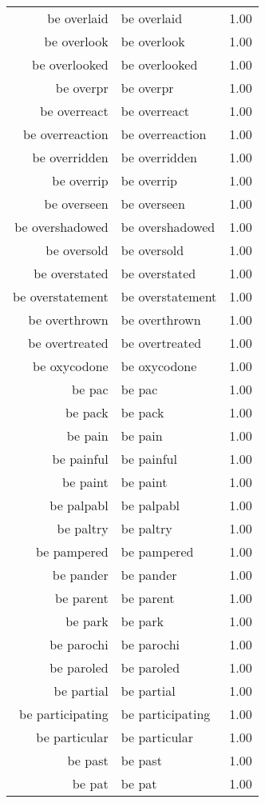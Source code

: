 \begin{table}[ht]
\begin{tabular}{rlr}
  be overlaid & be overlaid & 1.00 \\ 
  be overlook & be overlook & 1.00 \\ 
  be overlooked & be overlooked & 1.00 \\ 
  be overpr & be overpr & 1.00 \\ 
  be overreact & be overreact & 1.00 \\ 
  be overreaction & be overreaction & 1.00 \\ 
  be overridden & be overridden & 1.00 \\ 
  be overrip & be overrip & 1.00 \\ 
  be overseen & be overseen & 1.00 \\ 
  be overshadowed & be overshadowed & 1.00 \\ 
  be oversold & be oversold & 1.00 \\ 
  be overstated & be overstated & 1.00 \\ 
  be overstatement & be overstatement & 1.00 \\ 
  be overthrown & be overthrown & 1.00 \\ 
  be overtreated & be overtreated & 1.00 \\ 
  be oxycodone & be oxycodone & 1.00 \\ 
  be pac & be pac & 1.00 \\ 
  be pack & be pack & 1.00 \\ 
  be pain & be pain & 1.00 \\ 
  be painful & be painful & 1.00 \\ 
  be paint & be paint & 1.00 \\ 
  be palpabl & be palpabl & 1.00 \\ 
  be paltry & be paltry & 1.00 \\ 
  be pampered & be pampered & 1.00 \\ 
  be pander & be pander & 1.00 \\ 
  be parent & be parent & 1.00 \\ 
  be park & be park & 1.00 \\ 
  be parochi & be parochi & 1.00 \\ 
  be paroled & be paroled & 1.00 \\ 
  be partial & be partial & 1.00 \\ 
  be participating & be participating & 1.00 \\ 
  be particular & be particular & 1.00 \\ 
  be past & be past & 1.00 \\ 
  be pat & be pat & 1.00 \\ 

\end{tabular}
\end{table}

